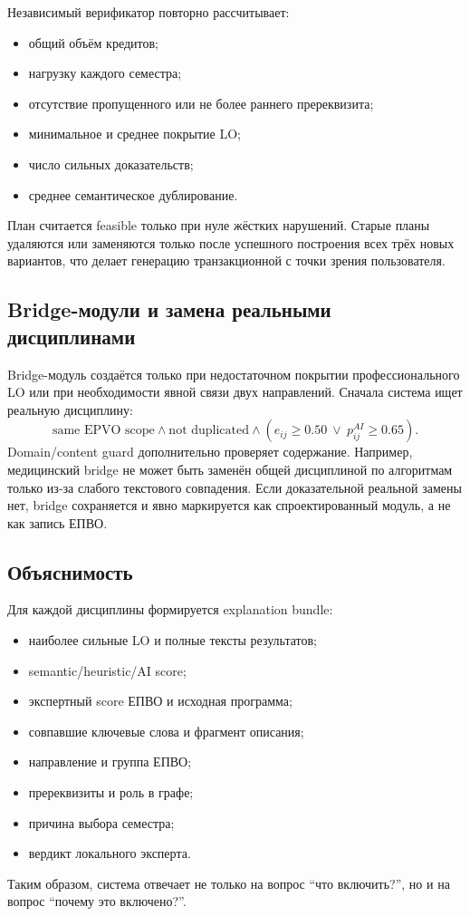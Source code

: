 \documentclass[twoside,11pt]{article}
\begin{document}
Независимый верификатор повторно рассчитывает:
\begin{itemize}
  \item общий объём кредитов;
  \item нагрузку каждого семестра;
  \item отсутствие пропущенного или не более раннего пререквизита;
  \item минимальное и среднее покрытие LO;
  \item число сильных доказательств;
  \item среднее семантическое дублирование.
\end{itemize}
План считается feasible только при нуле жёстких нарушений. Старые планы удаляются или заменяются только после успешного построения всех трёх новых вариантов, что делает генерацию транзакционной с точки зрения пользователя.

\subsection{Bridge-модули и замена реальными дисциплинами}

Bridge-модуль создаётся только при недостаточном покрытии профессионального LO или при необходимости явной связи двух направлений. Сначала система ищет реальную дисциплину:
\begin{equation}
  \text{same EPVO scope}
  \land
  \text{not duplicated}
  \land
  (e_{ij}\ge0.50\ \lor\ p_{ij}^{AI}\ge0.65).
  \label{eq:bridge-replacement}
\end{equation}
Domain/content guard дополнительно проверяет содержание. Например, медицинский bridge не может быть заменён общей дисциплиной по алгоритмам только из-за слабого текстового совпадения. Если доказательной реальной замены нет, bridge сохраняется и явно маркируется как спроектированный модуль, а не как запись ЕПВО.

\subsection{Объяснимость}

Для каждой дисциплины формируется explanation bundle:
\begin{itemize}
  \item наиболее сильные LO и полные тексты результатов;
  \item semantic/heuristic/AI score;
  \item экспертный score ЕПВО и исходная программа;
  \item совпавшие ключевые слова и фрагмент описания;
  \item направление и группа ЕПВО;
  \item пререквизиты и роль в графе;
  \item причина выбора семестра;
  \item вердикт локального эксперта.
\end{itemize}
Таким образом, система отвечает не только на вопрос ``что включить?'', но и на вопрос ``почему это включено?''.
\end{document}
